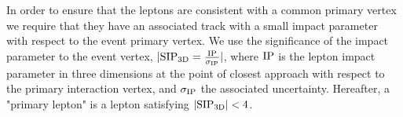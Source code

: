 \label{eleSIP}
In order to ensure that the leptons are consistent with a common primary vertex we require that they have an associated track with a small impact parameter with respect to the event primary vertex.
We use the significance of the impact parameter to the event vertex, $ | {\rm SIP_{3D}} = \frac{\rm IP}{\sigma_{\rm IP}} |$, where ${\rm IP}$ is the lepton impact parameter in three dimensions at the point of closest approach with respect to the primary interaction vertex, and $\sigma_{\rm IP}$ the associated uncertainty.  Hereafter, a "primary lepton" is a lepton satisfying $| {\rm SIP_{3D}} | < 4$.               
